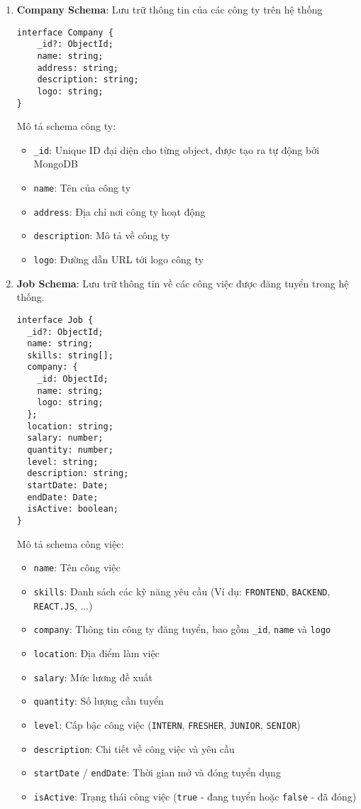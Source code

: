 \begin{enumerate}
    \item \textbf{Company Schema}: Lưu trữ thông tin của các công ty trên hệ thống
    \begin{lstlisting}[caption=Company Schema, numbers=none]
interface Company {
    _id?: ObjectId;
    name: string;
    address: string;
    description: string;
    logo: string;
}
    \end{lstlisting}
    Mô tả schema công ty:
    \begin{itemize}
        \item \texttt{\_id}: Unique ID đại diện cho từng object, được tạo ra tự động bởi MongoDB
        \item \texttt{name}: Tên của công ty
        \item \texttt{address}: Địa chỉ nơi công ty hoạt động
        \item \texttt{description}: Mô tả về công ty
        \item \texttt{logo}: Đường dẫn URL tới logo công ty
    \end{itemize}
    \vspace{1mm}
    \item \textbf{Job Schema}: Lưu trữ thông tin về các công việc được đăng tuyển trong hệ thống.
    \begin{lstlisting}[caption=Job Schema, numbers=none]
interface Job {
  _id?: ObjectId;
  name: string;
  skills: string[];
  company: {
    _id: ObjectId;         
    name: string;          
    logo: string;          
  };
  location: string;
  salary: number;
  quantity: number;
  level: string;
  description: string;
  startDate: Date;
  endDate: Date;
  isActive: boolean;   
}
    \end{lstlisting}
    Mô tả schema công việc:
    \begin{itemize}
        \item \texttt{name}: Tên công việc
        \item \texttt{skills}: Danh sách các kỹ năng yêu cầu (Ví dụ: \texttt{FRONTEND}, \texttt{BACKEND}, \texttt{REACT.JS}, ...)
        \item \texttt{company}: Thông tin công ty đăng tuyển, bao gồm \texttt{\_id}, \texttt{name} và \texttt{logo}
        \item \texttt{location}: Địa điểm làm việc
        \item \texttt{salary}: Mức lương đề xuất
        \item \texttt{quantity}: Số lượng cần tuyển
        \item \texttt{level}: Cấp bậc công việc (\texttt{INTERN}, \texttt{FRESHER}, \texttt{JUNIOR}, \texttt{SENIOR})
        \item \texttt{description}: Chi tiết về công việc và yêu cầu
        \item \texttt{startDate} / \texttt{endDate}: Thời gian mở và đóng tuyển dụng
        \item \texttt{isActive}: Trạng thái công việc (\texttt{true} - đang tuyển hoặc \texttt{false} - đã đóng)
    \end{itemize}


\end{enumerate}
